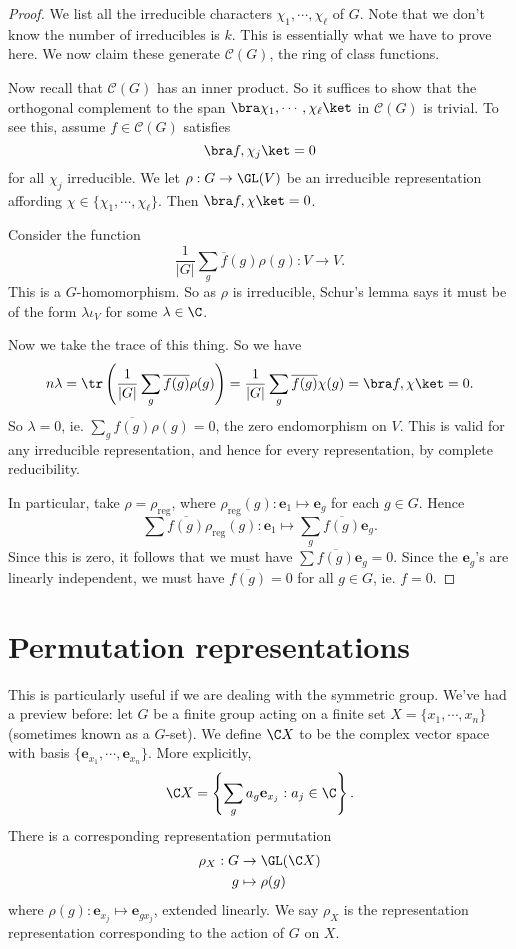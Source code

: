 \documentclass[a4paper]{article}
\begin{document}
\begin{proof}
  We list all the irreducible characters $\chi_1, \cdots, \chi_\ell$ of $G$. Note that we don't know the number of irreducibles is $k$. This is essentially what we have to prove here. We now claim these generate $\mathcal{C}(G)$, the ring of class functions.

  Now recall that $\mathcal{C}(G)$ has an inner product. So it suffices to show that the orthogonal complement to the span $\bra \chi_1, \cdots, \chi_\ell\ket$ in $\mathcal{C}(G)$ is trivial. To see this, assume $f \in \mathcal{C}(G)$ satisfies
  \[
    \bra f, \chi_j\ket = 0
  \]
  for all $\chi_j$ irreducible. We let $\rho: G \to \GL(V)$ be an irreducible representation affording $\chi \in \{\chi_1, \cdots, \chi_\ell\}$. Then $\bra f, \chi\ket = 0$.

  Consider the function
  \[
    \frac{1}{|G|} \sum_g \overline{f}(g) \rho(g): V \to V.
  \]
  This is a $G$-homomorphism. So as $\rho$ is irreducible, Schur's lemma says it must be of the form $\lambda \iota_V$ for some $\lambda \in \C$.

  Now we take the trace of this thing. So we have
  \[
    n\lambda = \tr\left(\frac{1}{|G|} \sum_g \overline{f(g)} \rho(g)\right) = \frac{1}{|G|} \sum_g \overline{f(g)} \chi(g) = \bra f, \chi\ket = 0.
  \]
  So $\lambda = 0$, ie. $\sum_g \overline{f(g)} \rho(g) = 0$, the zero endomorphism on $V$. This is valid for any irreducible representation, and hence for every representation, by complete reducibility.

  In particular, take $\rho = \rho_{\mathrm{reg}}$, where $\rho_{\mathrm{reg}}(g): \mathbf{e}_1 \mapsto \mathbf{e}_g$ for each $g \in G$. Hence
  \[
    \sum \overline{f(g)} \rho_{\mathrm{reg}}(g): \mathbf{e}_1 \mapsto \sum_g \overline{f(g)} \mathbf{e}_g.
  \]
  Since this is zero, it follows that we must have $\sum \overline{f(g)} \mathbf{e}_g = 0$. Since the $\mathbf{e}_g$'s are linearly independent, we must have $\overline{f(g)} = 0$ for all $g \in G$, ie. $f = 0$.
\end{proof}

\section{Permutation representations}
This is particularly useful if we are dealing with the symmetric group. We've had a preview before: let $G$ be a finite group acting on a finite set $X = \{x_1, \cdots, x_n\}$ (sometimes known as a $G$-set). We define $\C X$ to be the complex vector space with basis $\{\mathbf{e}_{x_1}, \cdots, \mathbf{e}_{x_n}\}$. More explicitly,
\[
  \C X = \left\{ \sum_g a_g \mathbf{e}_{x_j}: a_j \in \C\right\}.
\]
There is a corresponding representation permutation
\begin{align*}
  \rho_X: G &\to \GL(\C X)\\
  g &\mapsto \rho(g)
\end{align*}
where $\rho(g): \mathbf{e}_{x_j} \mapsto \mathbf{e}_{g x_j}$, extended linearly. We say $\rho_X$ is the representation representation corresponding to the action of $G$ on $X$.
\end{document}
